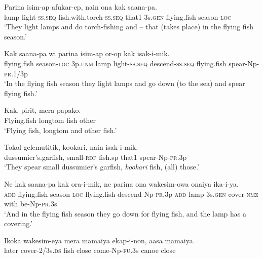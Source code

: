 \ea
\gll  Parina  isim-ap  afukar-ep,  nain            ona  kak  saana-pa. \\
lamp  light-\textsc{ss.seq}  fish.with.torch-\textsc{ss.seq}  that1  3s.\textsc{gen}  flying.fish  season-\textsc{loc} \\


\glt ‘They light lamps and do torch-fishing and – that (takes place) in the flying fish season.’ \\
\z


\ea
\gll  Kak  saana-pa  wi  parina  isim-ap              or-op  kak  isak-i-mik. \\
flying.fish  season-\textsc{loc}  3p.\textsc{unm}  lamp  light-\textsc{ss.seq}   descend-\textsc{ss.seq}  flying.fish  spear-Np-\textsc{pr}.1/3p \\


\glt ‘In the flying fish season they light lamps and go down (to the sea) and spear flying fish.’ \\
\z


\ea
\gll  Kak,  pirit,  mera  papako. \\
Flying.fish  longtom  fish  other \\
\glt ‘Flying fish, longtom and other fish.’ \\
\z


\ea
\gll  Tokol  gelemutitik,  kookari,  nain  isak-i-mik. \\
dussumier’s.garfish,  small-\textsc{rdp}  fish.sp  that1  spear-Np-\textsc{pr}.3p \\
\glt ‘They spear small dussumier’s garfish, \textit{kookari} fish, (all) those.’ \\
\z


\ea
\gll  Ne  kak  saana-pa  kak  ora-i-mik,  ne                      parina  ona  wakesim-owa  onaiya  ika-i-ya. \\
\textsc{add}  flying.fish  season-\textsc{loc}  flying.fish  descend-Np-\textsc{pr}.3p  \textsc{add}  lamp  3s.\textsc{gen}  cover-\textsc{nmz}  with  be-Np-\textsc{pr}.3s \\


\glt ‘And in the flying fish season they go down for flying fish, and the lamp has a covering.’ \\
\z


\ea
\gll  Ikoka  wakesim-eya  mera  mamaiya  ekap-i-non,  aasa  mamaiya. \\
later  cover-2/3s.\textsc{ds}  fish  close  come-Np-\textsc{fu}.3s      canoe  close \\


